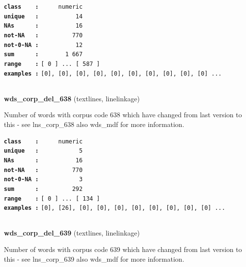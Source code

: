 \documentclass[]{article}
\begin{document}
\textbf{\texttt{class\ \ \ \ :}} \texttt{~~~~~numeric}\\
\textbf{\texttt{unique\ \ \ :}} \texttt{~~~~~~~~~~14}\\
\textbf{\texttt{NAs\ \ \ \ \ \ :}} \texttt{~~~~~~~~~~16}\\
\textbf{\texttt{not-NA\ \ \ :}} \texttt{~~~~~~~~~770}\\
\textbf{\texttt{not-0-NA\ :}} \texttt{~~~~~~~~~~12}\\
\textbf{\texttt{sum\ \ \ \ \ \ :}} \texttt{~~~~~~~1~667}\\
\textbf{\texttt{range\ \ \ \ :}}
\texttt{{[}\ 0\ {]}\ ...\ {[}\ 587\ {]}}\\
\textbf{\texttt{examples\ :}}
\texttt{{[}0{]},\ {[}0{]},\ {[}0{]},\ {[}0{]},\ {[}0{]},\ {[}0{]},\ {[}0{]},\ {[}0{]},\ {[}0{]},\ {[}0{]}\ ...}\\

~

\textbf{wds\_corp\_del\_638} (textlines, linelinkage)

Number of words with corpus code 638 which have changed from last
version to this - see lns\_corp\_638 also wds\_mdf for more information.

\textbf{\texttt{class\ \ \ \ :}} \texttt{~~~~~numeric}\\
\textbf{\texttt{unique\ \ \ :}} \texttt{~~~~~~~~~~~5}\\
\textbf{\texttt{NAs\ \ \ \ \ \ :}} \texttt{~~~~~~~~~~16}\\
\textbf{\texttt{not-NA\ \ \ :}} \texttt{~~~~~~~~~770}\\
\textbf{\texttt{not-0-NA\ :}} \texttt{~~~~~~~~~~~3}\\
\textbf{\texttt{sum\ \ \ \ \ \ :}} \texttt{~~~~~~~~~292}\\
\textbf{\texttt{range\ \ \ \ :}}
\texttt{{[}\ 0\ {]}\ ...\ {[}\ 134\ {]}}\\
\textbf{\texttt{examples\ :}}
\texttt{{[}0{]},\ {[}26{]},\ {[}0{]},\ {[}0{]},\ {[}0{]},\ {[}0{]},\ {[}0{]},\ {[}0{]},\ {[}0{]},\ {[}0{]}\ ...}\\

~

\textbf{wds\_corp\_del\_639} (textlines, linelinkage)

Number of words with corpus code 639 which have changed from last
version to this - see lns\_corp\_639 also wds\_mdf for more information.
\end{document}
